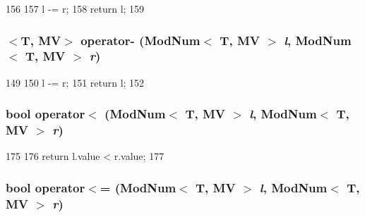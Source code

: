 \begin{DoxyCode}
156                                 {
157     l -= r;
158     return l;
159 }
\end{DoxyCode}
\hypertarget{mod__num_8hh_a0b84d236bd1e102c5583f610f6582935}{
\subsubsection[{operator-\/}]{$<$T, MV$>$ operator-\/ ({\bf ModNum}$<$ T, MV $>$ {\em l}, \/  {\bf ModNum}$<$ T, MV $>$ {\em r})}}
\label{mod__num_8hh_a0b84d236bd1e102c5583f610f6582935}



\begin{DoxyCode}
149                                             {
150     l -= r;
151     return l;
152 }
\end{DoxyCode}
\hypertarget{mod__num_8hh_a84830aa30009cb5c8024c1de6f771316}{
\subsubsection[{operator$<$}]{\setlength{\rightskip}{0pt plus 5cm}bool operator$<$ ({\bf ModNum}$<$ T, MV $>$ {\em l}, \/  {\bf ModNum}$<$ T, MV $>$ {\em r})}}
\label{mod__num_8hh_a84830aa30009cb5c8024c1de6f771316}



\begin{DoxyCode}
175                                             {
176     return l.value < r.value;
177 }
\end{DoxyCode}
\hypertarget{mod__num_8hh_a6eb41d5269e96df1206fe6a2eab3e656}{
\subsubsection[{operator$<$=}]{\setlength{\rightskip}{0pt plus 5cm}bool operator$<$= ({\bf ModNum}$<$ T, MV $>$ {\em l}, \/  {\bf ModNum}$<$ T, MV $>$ {\em r})}}
\label{mod__num_8hh_a6eb41d5269e96df1206fe6a2eab3e656}




